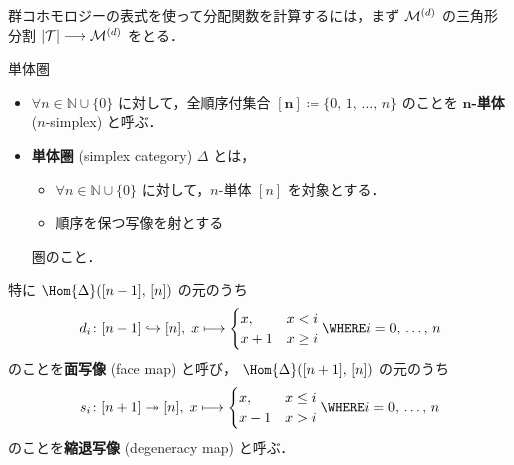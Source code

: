 \documentclass[TQFT_main]{subfiles}
\begin{document}
群コホモロジーの表式を使って分配関数を計算するには，まず $\mathcal{M}^{(d)}$ の三角形分割 $\abs{\mathcal{T}} \longrightarrow \mathcal{M}^{(d)}$ をとる．
\begin{mydef}[label=def:simplex-cat,breakable]{単体圏}
    \begin{itemize}
        \item $\forall n \in \mathbb{N} \cup \{0\}$ に対して，全順序付集合 $\bm{[n]} \coloneqq \{0,\, 1,\, \dots,\, n\}$ のことを $\bm{n}$\textbf{-単体} ($n$-simplex) と呼ぶ．
        \item \textbf{単体圏} (simplex category) $\Delta$ とは，
        \begin{itemize}
            \item $\forall n \in \mathbb{N} \cup \{0\}$ に対して，$n$-単体 $[n]$ を対象とする．
            \item 順序を保つ写像を射とする
        \end{itemize}
        圏のこと．
    \end{itemize}
    
    \tcblower

    特に $\Hom{\Delta} ([n-1],\, [n])$ の元のうち
    \begin{align}
        d_i \colon [n-1] \hookrightarrow [n],\; x \lmto 
        \begin{cases}
            x, &x < i \\
            x+1 &x \ge i
        \end{cases}
        \WHERE i = 0,\, \dots,\, n
    \end{align}
    のことを\textbf{面写像} (face map) と呼び，
    $\Hom{\Delta}([n+1],\, [n])$ の元のうち
    \begin{align}
        s_i \colon [n+1] \twoheadrightarrow [n],\; x \lmto 
        \begin{cases}
            x, &x \le i \\
            x-1 &x > i
        \end{cases}
        \WHERE i=0,\, \dots,\, n
    \end{align}
    のことを\textbf{縮退写像} (degeneracy map) と呼ぶ．
\end{mydef}
\end{document}

